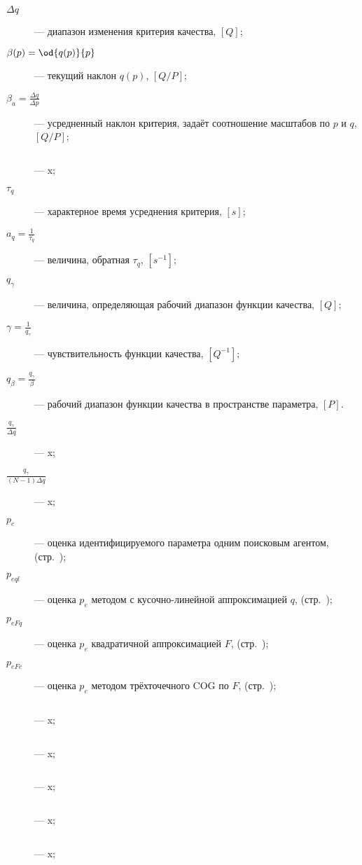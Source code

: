 \begin{description}
  \item[$\Delta q$]  --- диапазон изменения критерия качества, $[Q]$;

  \item[$\beta(p) = \od{q(p)}{p}$]  --- текущий наклон $q(p)$, $[Q/P]$;

  \item[$\beta_a = \frac{\Delta q}{\Delta p} $]  --- усредненный наклон критерия, задаёт соотношение масштабов по $p$ и $q$, $[Q/P]$;

  \item[$ $]  --- x;

  \item[$\tau_q$]  --- характерное время усреднения критерия, $[s]$;

  \item[$a_q = \frac{1}{\tau_q} $]  --- величина, обратная $\tau_q$, $[s^{-1}]$;

  \item[$q_\gamma $]  --- величина, определяющая рабочий диапазон функции качества, $[Q]$;

  \item[$\gamma = \frac{1}{q_\gamma} $]  --- чувствительность функции качества, $[Q^{-1}]$;

  \item[$q_\beta = \frac{q_\gamma}{\beta} $]  --- рабочий диапазон функции качества в пространстве параметра, $[P]$.

  \item[$\frac{q_\gamma}{\Delta q} $]  --- x;

  \item[$\frac{q_\gamma}{(N-1)\Delta q} $]  --- x;

  \item[$p_{e} $]  --- оценка идентифицируемого параметра одним поисковым агентом, (стр.~\pageref{atu:d:p_e});

  \item[$p_{eql} $]  --- оценка $p_e$ методом с кусочно-линейной аппроксимацией $q$, (стр.~\pageref{atu:d:p_eql});

  \item[$p_{eFq} $]  --- оценка $p_e$ квадратичной аппроксимацией $F$, (стр.~\pageref{atu:eq:p_eFq});

  \item[$p_{eFc} $]  --- оценка $p_e$ методом трёхточечного COG по $F$, (стр.~\pageref{atu:eq:p_eFc});

  \item[$ $]  --- x;

  \item[$ $]  --- x;

  \item[$ $]  --- x;

  \item[$ $]  --- x;

  \item[$ $]  --- x;


\end{description}



